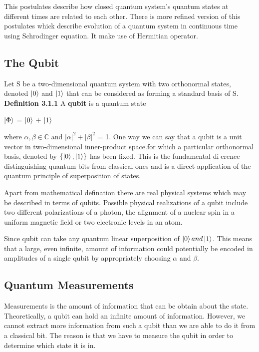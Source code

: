 \documentclass[11 pt]{article}
\theoremstyle{definition}
\theoremstyle{remark}
\begin{document}
This postulates describe how closed quantum system's quantum states at different times are related to each other. There is more refined version of this postulates whick describe evolution of a quantum system in continuous time using Schrodinger equation. It make use of Hermitian operator.

\subsection{The Qubit}
Let S be a two-dimensional quantum system with two orthonormal states, denoted $\ket{0}$ and $\ket{1}$ that can be considered as forming a standard basis of S. \vspace{5mm} \newline
\textbf{Definition 3.1.1} A \textbf{qubit} is a quantum state 
\begin{center}
 $\ket{\Phi}$ = \alpha$\ket{0}$ + \beta$\ket{1}$
\end{center}
where $\alpha,\beta \in \mathbb{C}$ and $\left|\alpha\right |^2 + \left|\beta\right|^2 $ = 1.\newline
One way we can say that a qubit is a unit vector in two-dimensional inner-product space.for which a particular orthonormal basis, denoted by $\{\ket{0},\ket{1}\}$ has been fixed. This is the fundamental dierence
distinguishing quantum bits from classical ones and is a direct application of the quantum principle of superposition of states.\par
Apart from mathematical defination there are  real physical systems which
may be described in terms of qubits. Possible physical realizations of a qubit include two different polarizations of a photon, the alignment of a nuclear spin in a uniform magnetic field or two electronic levels in an atom.

Since qubit can take any quantum linear superposition of $\ket{0} and \ket{1}$. This means that a large, even infinite, amount of information could potentially be encoded in amplitudes of a single qubit by appropriately choosing $\alpha$ and $\beta$.


\subsection{Quantum Measurements}
Measurements is the amount of information that can be obtain about the state. Theoretically, a qubit can hold an infinite amount of information. However, we cannot extract more information from such a
qubit than we are able to do it from a classical bit. The reason is that we have to measure the qubit in order to determine which state it is in.
\end{document}
